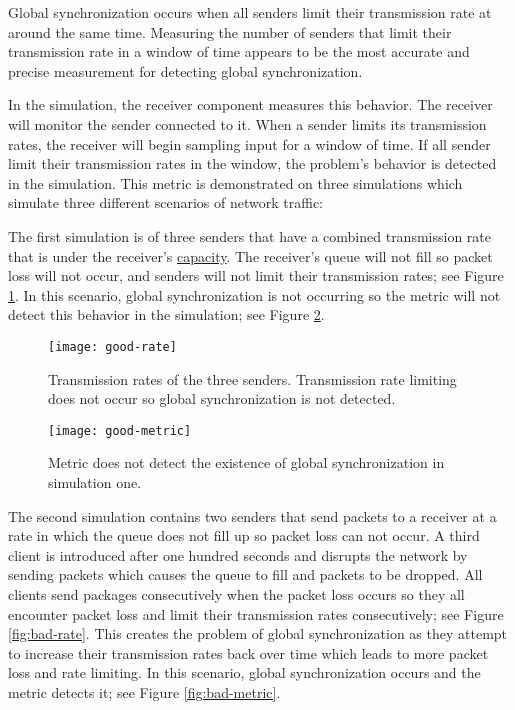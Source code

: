 \documentclass{article}
\begin{document}
Global synchronization occurs when all senders limit their transmission rate at around the same time. Measuring the number of senders that limit their transmission rate in a window of time appears to be the most accurate and precise measurement for detecting global synchronization.
						
In the simulation, the receiver component measures this behavior. The receiver will monitor the sender connected to it. When a sender limits its transmission rates, the receiver will begin sampling input for a window of time. If all sender limit their transmission rates in the window, the problem's behavior is detected in the simulation. This metric is demonstrated on three simulations which simulate three different scenarios of network traffic:
											
The first simulation is of three senders that have a combined transmission rate that is under the receiver's \href{https://www.solarwinds.com/resources/it-glossary/network-capacity}{capacity}. The receiver's queue will not fill so packet loss will not occur, and senders will not limit their transmission rates; see Figure \ref{fig:good-rate}. In this scenario, global synchronization is not occurring so the metric will not detect this behavior in the simulation; see Figure \ref{fig:good-metric}.
	
\begin{figure}[H]
	\centering
	\texttt{[image: good-rate]}
	\caption{Transmission rates of the three senders. Transmission rate limiting does not occur so global synchronization is not detected.}
	\label{fig:good-rate}
\end{figure}

\begin{figure}[H]
	\centering
	\texttt{[image: good-metric]}
	\caption{Metric does not detect the existence of global synchronization in simulation one.}
	\label{fig:good-metric}
\end{figure}

The second simulation contains two senders that send packets to a receiver at a rate in which the queue does not fill up so packet loss can not occur. A third client is introduced after one hundred seconds and disrupts the network by sending packets which causes the queue to fill and packets to be dropped. All clients send packages consecutively when the packet loss occurs so they all encounter packet loss and limit their transmission rates consecutively; see Figure \ref{fig:bad-rate}. This creates the problem of global synchronization as they attempt to increase their transmission rates back over time which leads to more packet loss and rate limiting. In this scenario, global synchronization occurs and the metric detects it; see Figure \ref{fig:bad-metric}.
\end{document}
